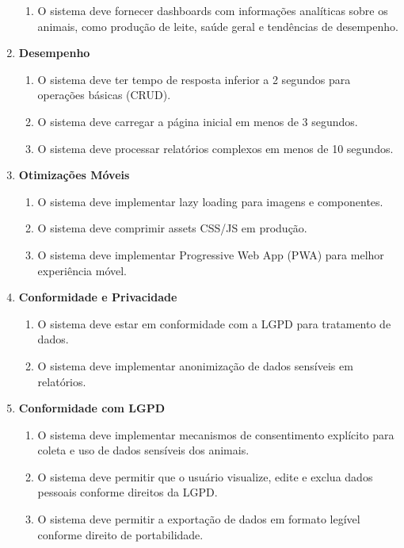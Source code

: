 \documentclass[12pt, a4paper]{article}
\begin{document}
\begin{spacing}{1.5}
\begin{spacing}{1.5}
\begin{enumerate}[label=RNF0\arabic{*}.]
    \begin{enumerate}[label=RF05.0\arabic{*}]
        \item O sistema deve fornecer dashboards com informações analíticas sobre os animais, como produção de leite, saúde geral e tendências de desempenho.
    \end{enumerate}
    \item \textbf{Desempenho}
    \begin{enumerate}[label=RNF06.0\arabic{*}]
        \item O sistema deve ter tempo de resposta inferior a 2 segundos para operações básicas (CRUD).
        \item O sistema deve carregar a página inicial em menos de 3 segundos.
        \item O sistema deve processar relatórios complexos em menos de 10 segundos.
    \end{enumerate}
    \item \textbf{Otimizações Móveis}
    \begin{enumerate}[label=RNF07.0\arabic{*}]
        \item O sistema deve implementar lazy loading para imagens e componentes.
        \item O sistema deve comprimir assets CSS/JS em produção.
        \item O sistema deve implementar Progressive Web App (PWA) para melhor experiência móvel.
    \end{enumerate}
    \item \textbf{Conformidade e Privacidade}
    \begin{enumerate}[label=RNF08.0\arabic{*}]
        \item O sistema deve estar em conformidade com a LGPD para tratamento de dados.
        \item O sistema deve implementar anonimização de dados sensíveis em relatórios.
    \end{enumerate}
    \item \textbf{Conformidade com LGPD}
    \begin{enumerate}[label=RNF09.0\arabic{*}]
        \item O sistema deve implementar mecanismos de consentimento explícito para coleta e uso de dados sensíveis dos animais.
        \item O sistema deve permitir que o usuário visualize, edite e exclua dados pessoais conforme direitos da LGPD.
        \item O sistema deve permitir a exportação de dados em formato legível conforme direito de portabilidade.
    \end{enumerate}
\end{enumerate}
\end{spacing}


\end{spacing}
\end{document}
